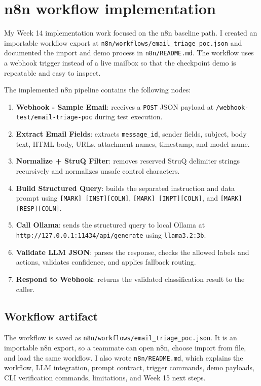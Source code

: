\documentclass[11pt,a4paper]{article}
\begin{document}
\section{n8n workflow implementation}

My Week 14 implementation work focused on the n8n baseline path. I created an importable workflow export at \texttt{n8n/workflows/email\_triage\_poc.json} and documented the import and demo process in \texttt{n8n/README.md}. The workflow uses a webhook trigger instead of a live mailbox so that the checkpoint demo is repeatable and easy to inspect.

The implemented n8n pipeline contains the following nodes:

\begin{enumerate}[leftmargin=2em]
  \item \textbf{Webhook - Sample Email}: receives a \texttt{POST} JSON payload at \texttt{/webhook-test/email-triage-poc} during test execution.
  \item \textbf{Extract Email Fields}: extracts \texttt{message\_id}, sender fields, subject, body text, HTML body, URLs, attachment names, timestamp, and model name.
  \item \textbf{Normalize + StruQ Filter}: removes reserved StruQ delimiter strings recursively and normalizes unsafe control characters.
  \item \textbf{Build Structured Query}: builds the separated instruction and data prompt using \texttt{[MARK] [INST][COLN]}, \texttt{[MARK] [INPT][COLN]}, and \texttt{[MARK] [RESP][COLN]}.
  \item \textbf{Call Ollama}: sends the structured query to local Ollama at \texttt{http://127.0.0.1:11434/api/generate} using \texttt{llama3.2:3b}.
  \item \textbf{Validate LLM JSON}: parses the response, checks the allowed labels and actions, validates confidence, and applies fallback routing.
  \item \textbf{Respond to Webhook}: returns the validated classification result to the caller.
\end{enumerate}

\subsection{Workflow artifact}

The workflow is saved as \texttt{n8n/workflows/email\_triage\_poc.json}. It is an importable n8n export, so a teammate can open n8n, choose import from file, and load the same workflow. I also wrote \texttt{n8n/README.md}, which explains the workflow, LLM integration, prompt contract, trigger commands, demo payloads, CLI verification commands, limitations, and Week 15 next steps.
\end{document}
